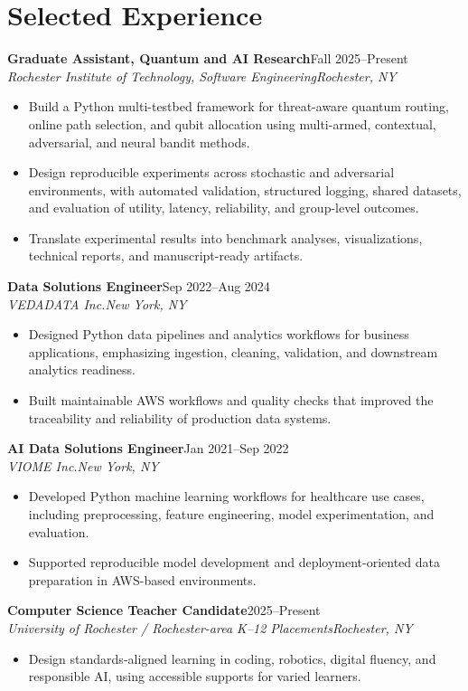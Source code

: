 \documentclass[10pt,letterpaper]{article}
\newcommand{\role}[4]{%
  \textbf{#1}\hfill #2\\
  \textit{#3}\hfill \textit{#4}\vspace{-3pt}
}
\begin{document}
\section*{Selected Experience}
\role{Graduate Assistant, Quantum and AI Research}{Fall 2025--Present}
{Rochester Institute of Technology, Software Engineering}{Rochester, NY}
\begin{itemize}
  \item Build a Python multi-testbed framework for threat-aware quantum routing,
    online path selection, and qubit allocation using multi-armed, contextual,
    adversarial, and neural bandit methods.
  \item Design reproducible experiments across stochastic and adversarial
    environments, with automated validation, structured logging, shared
    datasets, and evaluation of utility, latency, reliability, and
    group-level outcomes.
  \item Translate experimental results into benchmark analyses,
    visualizations, technical reports, and manuscript-ready artifacts.
\end{itemize}

\role{Data Solutions Engineer}{Sep 2022--Aug 2024}
{VEDADATA Inc.}{New York, NY}
\begin{itemize}
  \item Designed Python data pipelines and analytics workflows for business
    applications, emphasizing ingestion, cleaning, validation, and downstream
    analytics readiness.
  \item Built maintainable AWS workflows and quality checks that improved the
    traceability and reliability of production data systems.
\end{itemize}

\role{AI Data Solutions Engineer}{Jan 2021--Sep 2022}
{VIOME Inc.}{New York, NY}
\begin{itemize}
  \item Developed Python machine learning workflows for healthcare use cases,
    including preprocessing, feature engineering, model experimentation, and
    evaluation.
  \item Supported reproducible model development and deployment-oriented data
    preparation in AWS-based environments.
\end{itemize}

\role{Computer Science Teacher Candidate}{2025--Present}
{University of Rochester / Rochester-area K--12 Placements}{Rochester, NY}
\begin{itemize}
  \item Design standards-aligned learning in coding, robotics, digital fluency,
    and responsible AI, using accessible supports for varied learners.
\end{itemize}
\end{document}
